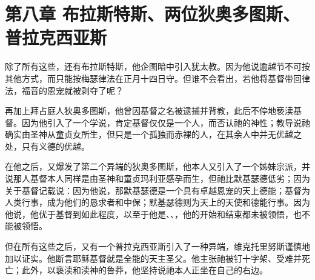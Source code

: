 \section{第八章 布拉斯特斯、两位狄奥多图斯、普拉克西亚斯}

除了所有这些，还有布拉斯特斯，他企图暗中引入犹太教。因为他说逾越节不可按其他方式，而只能按梅瑟律法在正月十四日守。但谁不会看出，若他将基督带回律法，福音的恩宠就被剥夺了呢？\par

再加上拜占庭人狄奥多图斯，他曾因基督之名被逮捕并背教，此后不停地亵渎基督。因为他引入了一个学说，肯定基督仅仅是一个人，而否认祂的神性；教导说祂确实由圣神从童贞女所生，但只是一个孤独而赤裸的人，在其余人中并无优越之处，只有义德的优越。\par

在他之后，又爆发了第二个异端的狄奥多图斯，他本人又引入了一个姊妹宗派，并说那人基督本人同样是由圣神和童贞玛利亚感孕而生，但祂比默基瑟德低劣；因为关于基督记载说：因为他说，那默基瑟德是一个具有卓越恩宠的天上德能；基督为人类行事，成为他们的恳求者和中保；默基瑟德则为天上的天使和德能行事。因为他说，他优于基督到如此程度，以至于他是、、，他的开始和结束都未被领悟，也不能被领悟。\par

但在所有这些之后，又有一个普拉克西亚斯引入了一种异端，维克托里努斯谨慎地加以证实。他断言耶稣基督就是全能的天主圣父。他主张祂被钉十字架、受难并死亡；此外，以亵渎和渎神的鲁莽，他坚持说祂本人正坐在自己的右边。\par

